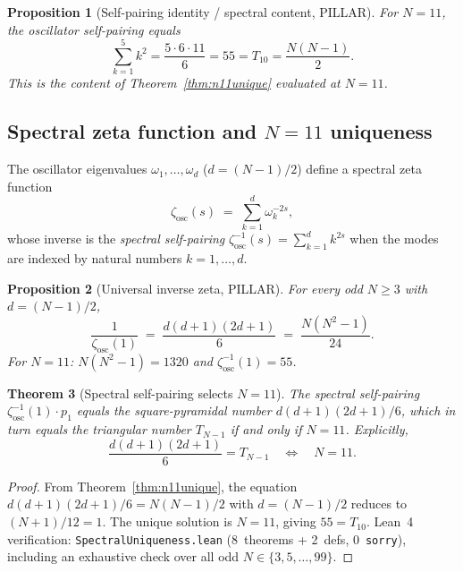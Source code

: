 \documentclass[aps,prd,twocolumn,superscriptaddress,floatfix,nofootinbib]{revtex4-2}
\newtheorem{theorem}{Theorem}
\newtheorem{proposition}[theorem]{Proposition}
\theoremstyle{definition}
\theoremstyle{remark}
\begin{document}
\begin{proposition}[Self-pairing identity / spectral content, PILLAR]
\label{prop:self-pairing-55}
\label{prop:spectral-content}
For $N=11$, the oscillator self-pairing equals
\[
  \sum_{k=1}^{5} k^2 = \frac{5 \cdot 6 \cdot 11}{6} = 55 = T_{10} = \frac{N(N-1)}{2}.
\]
This is the content of Theorem~\ref{thm:n11unique} evaluated at $N=11$.
\end{proposition}

\subsection{Spectral zeta function and $N{=}11$ uniqueness}
\label{sec:spectral-zeta-uniqueness}

The oscillator eigenvalues $\omega_1,\ldots,\omega_d$ ($d=(N-1)/2$)
define a spectral zeta function
\begin{equation}
\label{eq:zeta-osc}
  \zeta_{\mathrm{osc}}(s) \;=\; \sum_{k=1}^{d} \omega_k^{-2s},
\end{equation}
whose inverse is the \emph{spectral self-pairing}
$\zeta_{\mathrm{osc}}^{-1}(s) = \sum_{k=1}^{d} k^{2s}$
when the modes are indexed by natural numbers $k = 1,\ldots,d$.

\begin{proposition}[Universal inverse zeta, PILLAR]
\label{prop:zeta-universal}
For every odd $N \geq 3$ with $d = (N-1)/2$,
\[
  \frac{1}{\zeta_{\mathrm{osc}}(1)}
  \;=\; \frac{d(d+1)(2d+1)}{6}
  \;=\; \frac{N(N^2-1)}{24}.
\]
For $N = 11$: $N(N^2-1) = 1320$ and $\zeta_{\mathrm{osc}}^{-1}(1) = 55$.
\end{proposition}

\begin{theorem}[Spectral self-pairing selects $N{=}11$]
\label{thm:zeta-self-pairing}
The spectral self-pairing $\zeta_{\mathrm{osc}}^{-1}(1) \cdot p_1$
equals the square-pyramidal number $d(d{+}1)(2d{+}1)/6$, which in
turn equals the triangular number $T_{N-1}$ \emph{if and only if}
$N = 11$.  Explicitly,
\begin{equation}
\label{eq:zeta-triangular}
  \frac{d(d+1)(2d+1)}{6} = T_{N-1}
  \quad\Longleftrightarrow\quad
  N = 11.
\end{equation}
\end{theorem}

\begin{proof}
From Theorem~\ref{thm:n11unique}, the equation $d(d{+}1)(2d{+}1)/6
= N(N{-}1)/2$ with $d = (N{-}1)/2$ reduces to $(N{+}1)/12 = 1$.
The unique solution is $N = 11$, giving $55 = T_{10}$.
Lean~4 verification: \texttt{SpectralUniqueness.lean}
(8~theorems + 2~defs, 0~\texttt{sorry}), including an exhaustive
check over all odd $N \in \{3,5,\ldots,99\}$.
\end{proof}
\end{document}
